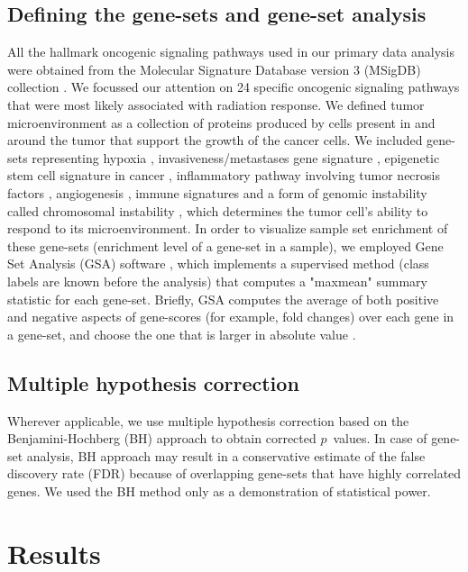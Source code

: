 \documentclass[hidelinks,11pt]{article}
\begin{document}
\subsection*{Defining the gene-sets and gene-set analysis}

All the hallmark oncogenic signaling pathways used in our primary data analysis were obtained from the Molecular Signature Database version 3 (MSigDB) collection \cite{msigdb_hm}. We focussed our attention on 24 specific oncogenic signaling pathways that were most likely associated with radiation response. We defined tumor microenvironment as a collection of proteins produced by cells present in and around the tumor that support the growth of the cancer cells. We included gene-sets representing hypoxia \cite{hypoxia}, invasiveness/metastases gene signature \cite{IGS}, epigenetic stem cell signature in cancer \cite{epigen}, inflammatory pathway involving tumor necrosis factors \cite{TNF}, angiogenesis \cite{WH}, immune signatures \cite{immune} and a form of genomic instability called chromosomal instability \cite{CIN}, which determines the tumor cell's ability to respond to its microenvironment. In order to visualize sample set enrichment of these gene-sets (enrichment level of a gene-set in a sample), we employed Gene Set Analysis (GSA) software \cite{gsa_software}, which implements a supervised method (class labels are known before the analysis) that computes a "maxmean" summary statistic for each gene-set. Briefly, GSA computes the average of both positive and negative aspects of gene-scores (for example, fold changes) over each gene in a gene-set, and choose the one that is larger in absolute value \cite{gsa}. %

\subsection*{Multiple hypothesis correction}

Wherever applicable, we use multiple hypothesis correction based on the Benjamini-Hochberg (BH) approach \cite{BH} to obtain corrected $p$~values. In case of gene-set analysis, BH approach may result in a conservative estimate of the false discovery rate (FDR) because of overlapping gene-sets that have highly correlated genes. We used the BH method only as a demonstration of statistical power. 

\section*{Results}
\end{document}
